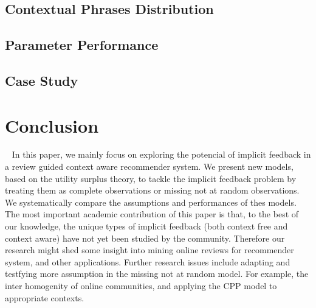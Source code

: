 \documentclass{llncs}
\begin{document}
\subsection{Contextual Phrases Distribution}

\subsection{Parameter Performance}

\subsection{Case Study}

\section{Conclusion}~\label{sec:con}
In this paper, we mainly focus on exploring the potencial of implicit feedback in a review guided context aware recommender system. We present new models, based on the utility surplus theory, to tackle the implicit feedback problem by treating them as complete observations or missing not at random observations. We systematically compare the assumptions and performances of thes models.
The most important academic contribution of this paper is that, to the best of our
knowledge, the unique types of implicit feedback (both context free and context aware) have not yet been studied by the community. Therefore our research might shed some insight into mining online reviews for recommender system, and other applications.
Further research issues include adapting and testfying more assumption in the missing not at random model.
For example, the inter homogenity of online communities, and applying the CPP model to appropriate contexts.
\end{document}
